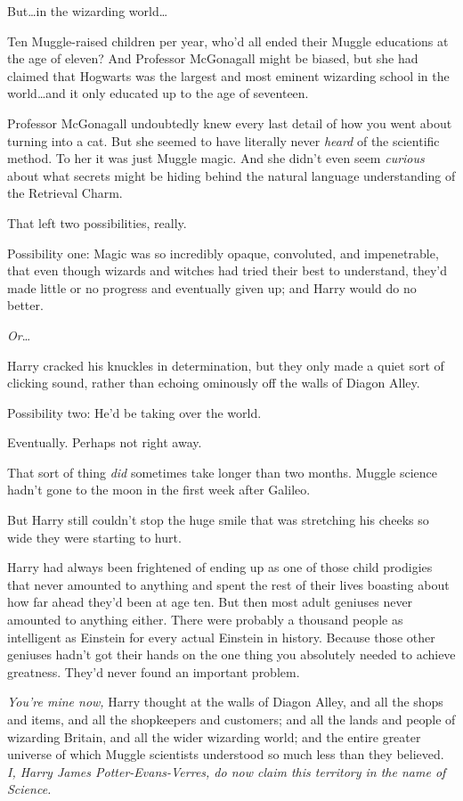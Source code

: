 But…in the wizarding world…

Ten Muggle-raised children per year, who’d all ended their Muggle educations at the age of eleven? And Professor McGonagall might be biased, but she had claimed that Hogwarts was the largest and most eminent wizarding school in the world…and it only educated up to the age of seventeen.

Professor McGonagall undoubtedly knew every last detail of how you went about turning into a cat. But she seemed to have literally never \emph{heard} of the scientific method. To her it was just Muggle magic. And she didn’t even seem \emph{curious} about what secrets might be hiding behind the natural language understanding of the Retrieval Charm.

That left two possibilities, really.

Possibility one: Magic was so incredibly opaque, convoluted, and impenetrable, that even though wizards and witches had tried their best to understand, they’d made little or no progress and eventually given up; and Harry would do no better.

\emph{Or}…

Harry cracked his knuckles in determination, but they only made a quiet sort of clicking sound, rather than echoing ominously off the walls of Diagon Alley.

Possibility two: He’d be taking over the world.

Eventually. Perhaps not right away.

That sort of thing \emph{did} sometimes take longer than two months. Muggle science hadn’t gone to the moon in the first week after Galileo.

But Harry still couldn’t stop the huge smile that was stretching his cheeks so wide they were starting to hurt.

Harry had always been frightened of ending up as one of those child prodigies that never amounted to anything and spent the rest of their lives boasting about how far ahead they’d been at age ten. But then most adult geniuses never amounted to anything either. There were probably a thousand people as intelligent as Einstein for every actual Einstein in history. Because those other geniuses hadn’t got their hands on the one thing you absolutely needed to achieve greatness. They’d never found an important problem.

\emph{You’re mine now,} Harry thought at the walls of Diagon Alley, and all the shops and items, and all the shopkeepers and customers; and all the lands and people of wizarding Britain, and all the wider wizarding world; and the entire greater universe of which Muggle scientists understood so much less than they believed. \emph{I, Harry James Potter-Evans-Verres, do now claim this territory in the name of Science.}

